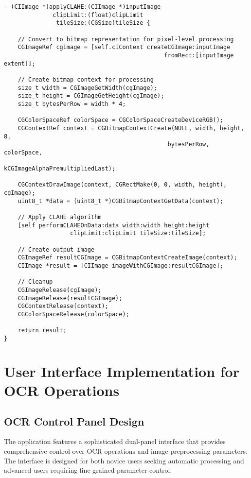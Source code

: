 \begin{verbatim}
- (CIImage *)applyCLAHE:(CIImage *)inputImage 
              clipLimit:(float)clipLimit 
               tileSize:(CGSize)tileSize {
    
    // Convert to bitmap representation for pixel-level processing
    CGImageRef cgImage = [self.ciContext createCGImage:inputImage 
                                              fromRect:[inputImage extent]];
    
    // Create bitmap context for processing
    size_t width = CGImageGetWidth(cgImage);
    size_t height = CGImageGetHeight(cgImage);
    size_t bytesPerRow = width * 4;
    
    CGColorSpaceRef colorSpace = CGColorSpaceCreateDeviceRGB();
    CGContextRef context = CGBitmapContextCreate(NULL, width, height, 8, 
                                               bytesPerRow, colorSpace,
                                               kCGImageAlphaPremultipliedLast);
    
    CGContextDrawImage(context, CGRectMake(0, 0, width, height), cgImage);
    uint8_t *data = (uint8_t *)CGBitmapContextGetData(context);
    
    // Apply CLAHE algorithm
    [self performCLAHEOnData:data width:width height:height 
                   clipLimit:clipLimit tileSize:tileSize];
    
    // Create output image
    CGImageRef resultCGImage = CGBitmapContextCreateImage(context);
    CIImage *result = [CIImage imageWithCGImage:resultCGImage];
    
    // Cleanup
    CGImageRelease(cgImage);
    CGImageRelease(resultCGImage);
    CGContextRelease(context);
    CGColorSpaceRelease(colorSpace);
    
    return result;
}
\end{verbatim}

\section{User Interface Implementation for OCR Operations}

\subsection{OCR Control Panel Design}

The application features a sophisticated dual-panel interface that provides comprehensive control over OCR operations and image preprocessing parameters. The interface is designed for both novice users seeking automatic processing and advanced users requiring fine-grained parameter control.

